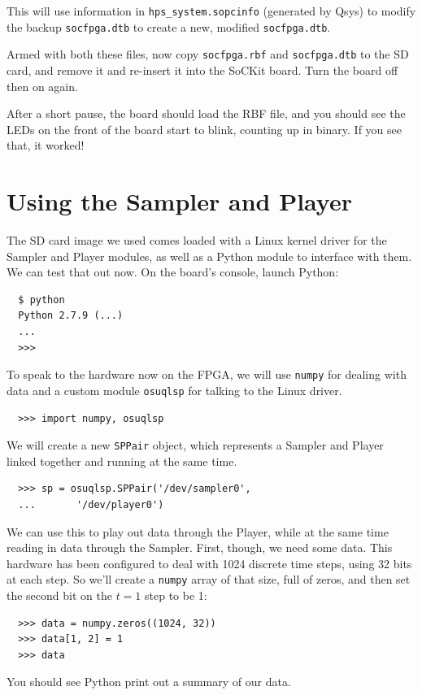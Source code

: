\documentclass{sockitguide}
\begin{document}
This will use information in \texttt{hps\_system.sopcinfo} (generated
by Qsys) to modify the backup \texttt{socfpga.dtb} to create a new,
modified \texttt{socfpga.dtb}.

Armed with both these files, now copy \texttt{socfpga.rbf} and
\texttt{socfpga.dtb} to the SD card, and remove it and re-insert it
into the SoCKit board. Turn the board off then on again.

After a short pause, the board should load the RBF file, and you
should see the LEDs on the front of the board start to blink, counting
up in binary. If you see that, it worked!

\section{Using the Sampler and Player}

The SD card image we used comes loaded with a Linux kernel driver for
the Sampler and Player modules, as well as a Python module to
interface with them. We can test that out now. On the board's console,
launch Python:
\begin{verbatim}
  $ python
  Python 2.7.9 (...)
  ...
  >>>
\end{verbatim}

To speak to the hardware now on the FPGA, we will use \texttt{numpy}
for dealing with data and a custom module \texttt{osuqlsp} for talking
to the Linux driver.
\begin{verbatim}
  >>> import numpy, osuqlsp
\end{verbatim}

We will create a new \texttt{SPPair} object, which represents a
Sampler and Player linked together and running at the same time.
\begin{verbatim}
  >>> sp = osuqlsp.SPPair('/dev/sampler0',
  ...       '/dev/player0')
\end{verbatim}

We can use this to play out data through the Player, while at the same
time reading in data through the Sampler. First, though, we need some
data. This hardware has been configured to deal with \num{1024}
discrete time steps, using \num{32} bits at each step. So we'll create
a \texttt{numpy} array of that size, full of zeros, and then set the
second bit on the $t = 1$ step to be \num{1}:
\begin{verbatim}
  >>> data = numpy.zeros((1024, 32))
  >>> data[1, 2] = 1
  >>> data
\end{verbatim}
You should see Python print out a summary of our data.
\end{document}
